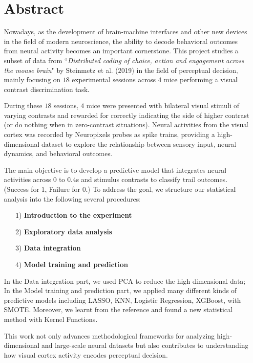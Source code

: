 \documentclass{article}
\begin{document}
	\section{Abstract}
	\par Nowadays, as the development of brain-machine interfaces and other new devices in the field of modern neuroscience, the ability to decode behavioral outcomes from neural activity becomes an important cornerstone. This project studies a subset of data from ``\textit{Distributed coding of choice, action and engagement across the mouse brain}" by Steinmetz et al. (2019)\cite{ref1} in the field of perceptual decision, mainly focusing on $18$ experimental sessions across $4$ mice performing a visual contrast discrimination task.
	\par During these $18$ sessions, $4$ mice were presented with bilateral visual stimuli of varying contrasts and rewarded for correctly indicating the side of higher contrast (or do nothing when in zero-contrast situations). Neural activities from the visual cortex was recorded by Neuropixels probes as spike trains, providing a high-dimensional dataset to explore the relationship between sensory input, neural dynamics, and behavioral outcomes.
	\par The main objective is to develop a predictive model that integrates neural activities across $0$ to $0.4$s and stimulus contrasts to classify trail outcomes. (Success for $1$, Failure for $0.$) To address the goal, we structure our statistical analysis into the following several procedures:
	\begin{itemize}
		\item [1)] \textbf{Introduction to the experiment}
		\item [2)] \textbf{Exploratory data analysis}
		\item [3)] \textbf{Data integration}
		\item [4)] \textbf{Model training and prediction}
	\end{itemize}
	\par In the Data integration part, we used PCA to reduce the high dimensional data; In the Model training and prediction part, we applied many different kinds of predictive models including LASSO, KNN, Logistic Regression, XGBoost, with SMOTE. Moreover, we learnt from the reference\cite{ref1} and found a new statistical method with Kernel Functions.
	\par This work not only advances methodological frameworks for analyzing high-dimensional and large-scale neural datasets but also contributes to understanding how visual cortex activity encodes perceptual decision.
\end{document}
